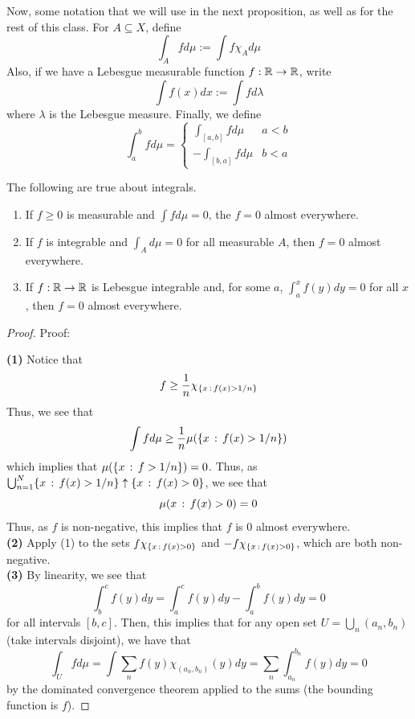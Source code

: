 Now, some notation that we will use in the next proposition, as well as for the rest of this class. For $A \subseteq X$, define
\[ \int_{A} f d\mu := \int f \chi_{A} d\mu \]
Also, if we have a Lebesgue measurable function $f : \mathbb{R} \to \mathbb{R}$, write
\[ \int f(x) dx := \int f d\lambda \]
where $\lambda$ is the Lebesgue measure. Finally, we define
\[ \int_{a}^{b} f d\mu = \left\{\begin{matrix} \int_{[a, b]}fd\mu & a < b \\ -\int_{[b, a]} f d\mu & b < a \end{matrix}\right. \]

\begin{lemma}
    The following are true about integrals.
    \begin{enumerate}
        \item If $f \geq 0$ is measurable and $\int f d\mu = 0$, the $f = 0$ almost everywhere.
        \item If $f$ is integrable and $\int_{A} d\mu = 0$ for all measurable $A$, then $f = 0$ almost everywhere.
        \item If $f : \mathbb{R} \to \mathbb{R}$ is Lebesgue integrable and, for some $a$, $\int_{a}^{x} f(y)dy = 0$ for all $x$, then $f = 0$ almost everywhere. 
    \end{enumerate}
\end{lemma}
\begin{proof}{Proof:}
    
    \textbf{(1)} Notice that
    \[ f \geq \frac{1}{n}\chi_{\{x \, :\, f(x) > 1/n\}} \]
    Thus, we see that
    \[ \int f d\mu \geq \frac{1}{n} \mu(\{x \, :\, f(x) > 1/n\}) \]
    which implies that $\mu(\{x \, :\, f > 1/n\}) = 0$. Thus, as $\bigcup_{n = 1}^{N} \{x \, :\, f(x) > 1/n\} \uparrow \{x \, :\, f(x) > 0\}$, we see that
    \[ \mu({x \, :\, f(x) > 0}) = 0 \]
    Thus, as $f$ is non-negative, this implies that $f$ is $0$ almost everywhere.\\

    \textbf{(2)} Apply (1) to the sets $f\chi_{\{x \, :\, f(x) > 0\}}$ and $-f\chi_{\{x \, :\, f(x) > 0\}}$, which are both non-negative.\\

    \textbf{(3)} By linearity, we see that
    \[ \int_{b}^{c} f(y) dy = \int_{a}^{c} f(y)dy - \int_{a}^{b}f(y)dy = 0 \]
    for all intervals $[b, c]$. Then, this implies that for any open set $U = \bigcup_{n}(a_n, b_n)$ (take intervals disjoint), we have that
    \[ \int_{U} f d\mu = \int \sum_{n} f(y)\chi_{(a_n, b_n)}(y)dy = \sum_{n} \int_{a_n}^{b_n} f(y)dy = 0 \]
    by the dominated convergence theorem applied to the sums (the bounding function is $f$). 
\end{proof}